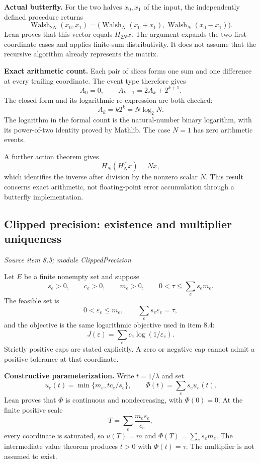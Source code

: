 \textbf{Actual butterfly.} For the two halves $x_0,x_1$ of the input, the independently defined procedure returns
\[
\operatorname{Walsh}_{2N}(x_0,x_1)
=\bigl(\operatorname{Walsh}_N(x_0+x_1),
       \operatorname{Walsh}_N(x_0-x_1)\bigr).
\]
Lean proves that this vector equals $H_{2N}x$. The argument expands the two first-coordinate cases and applies finite-sum distributivity. It does not assume that the recursive algorithm already represents the matrix.

\textbf{Exact arithmetic count.} Each pair of slices forms one sum and one difference at every trailing coordinate. The event type therefore gives
\[
A_0=0,\qquad A_{k+1}=2A_k+2^{k+1}.
\]
The closed form and its logarithmic re-expression are both checked:
\[
\boxed{A_k=k2^k=N\log_2N.}
\]
The logarithm in the formal count is the natural-number binary logarithm, with its power-of-two identity proved by Mathlib. The case $N=1$ has zero arithmetic events.

A further action theorem gives
\[
H_N(H_N^Tx)=Nx,
\]
which identifies the inverse after division by the nonzero scalar $N$. This result concerns exact arithmetic, not floating-point error accumulation through a butterfly implementation.



\subsection{Clipped precision: existence and multiplier uniqueness}\label{supp4:subsection:005}\textit{Source item 8.5; module ClippedPrecision}\par
Let $E$ be a finite nonempty set and suppose
\[
s_e>0,\qquad c_e>0,\qquad m_e>0,
\qquad 0<\tau\le\sum_e s_em_e.
\]
The feasible set is
\[
0<\varepsilon_e\le m_e,\qquad \sum_e s_e\varepsilon_e=\tau,
\]
and the objective is the same logarithmic objective used in item 8.4:
\[
J(\varepsilon)=\sum_e c_e\log(1/\varepsilon_e).
\]
Strictly positive caps are stated explicitly. A zero or negative cap cannot admit a positive tolerance at that coordinate.

\textbf{Constructive parameterization.} Write $t=1/\lambda$ and set
\[
u_e(t)=\min\{m_e,tc_e/s_e\},\qquad
\Phi(t)=\sum_e s_eu_e(t).
\]
Lean proves that $\Phi$ is continuous and nondecreasing, with $\Phi(0)=0$. At the finite positive scale
\[
T=\sum_e\frac{m_es_e}{c_e},
\]
every coordinate is saturated, so $u(T)=m$ and $\Phi(T)=\sum_es_em_e$. The intermediate value theorem produces $t>0$ with $\Phi(t)=\tau$. The multiplier is not assumed to exist.

